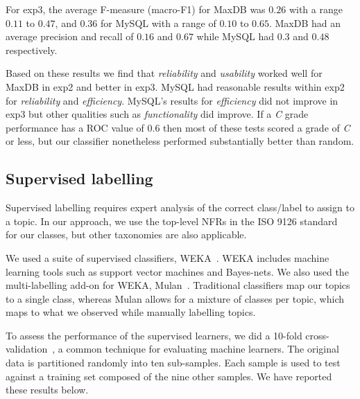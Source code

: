 \documentclass[]{sig-alternate}
\begin{document}
For \textsf{exp3}, the average F-measure (macro-F1) for MaxDB was $0.26$ with a range $0.11$ to
$0.47$, and $0.36$ for MySQL with a range of $0.10$ to $0.65$.
MaxDB had an average precision and recall of $0.16$ and $0.67$
while MySQL had $0.3$ and $0.48$ respectively.


Based on these results we find that \emph{reliability} and \emph{usability} worked well for MaxDB in \textsf{exp2} and better in \textsf{exp3}. 
MySQL had reasonable results within \textsf{exp2} for \emph{reliability} and \emph{efficiency}. 
MySQL's results for \emph{efficiency} did not improve in \textsf{exp3} but other qualities such as \emph{functionality} did improve. 
If a \emph{C} grade performance has a ROC value of $0.6$ then most of these tests scored a grade of \emph{C} or less, but our classifier nonetheless performed substantially better than random.


\subsection{Supervised labelling}
\label{sec:suplabelling}
Supervised labelling requires expert analysis of the correct class/label to assign to a topic. In our approach, we use the top-level NFRs in the ISO 9126 standard~\cite{iso9126} for our classes, but other taxonomies are also applicable.%

We used a suite of supervised classifiers, WEKA~\cite{weka09}. 
WEKA includes machine learning tools such as support vector machines and Bayes-nets. 
We also used the multi-labelling add-on for WEKA, Mulan~\cite{mulan}. %
Traditional classifiers map our topics to a single class, whereas Mulan allows for a mixture of classes per topic, which maps to what we observed while manually labelling topics.

To assess the performance of the supervised learners, we did a 10-fold cross-validation~\cite{Kohavi1995}, a common technique for evaluating machine learners. 
The original data is partitioned randomly into ten sub-samples. Each sample is used to test against a training set composed of the nine other samples.
We have reported these results below.%
\end{document}
